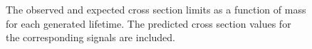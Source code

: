\begin{figure}
\\
\\
\label{fig:xsec_limit_metastable}
\caption{The observed and expected cross section limits as a function of mass for each generated lifetime. The predicted cross section values for the corresponding signals are included.}
\end{figure}



